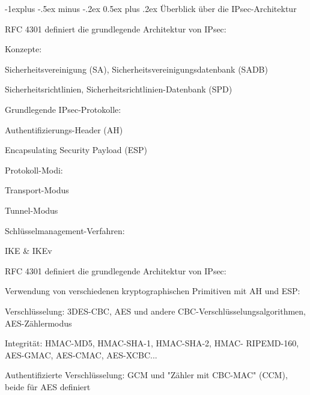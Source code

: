 \documentclass[a4paper]{article}
\makeatletter
\renewcommand{\subsection}{\@startsection{subsection}{2}{0mm}%
 {-1explus -.5ex minus -.2ex}%
 {0.5ex plus .2ex}%
 {\normalfont\normalsize\bfseries}}
\makeatother
\begin{document}
\begin{multicols}{3}


      \subsection{Überblick über die
            IPsec-Architektur}

      \begin{itemize*}
            \item RFC 4301 definiert die grundlegende Architektur von IPsec:
            \begin{itemize*}
                  \item Konzepte:
                  \begin{itemize*} \item Sicherheitsvereinigung (SA), Sicherheitsvereinigungsdatenbank (SADB) \item Sicherheitsrichtlinien, Sicherheitsrichtlinien-Datenbank (SPD) \end{itemize*}
                  \item Grundlegende IPsec-Protokolle:
                  \begin{itemize*} \item Authentifizierungs-Header (AH) \item Encapsulating Security Payload (ESP) \end{itemize*}
                  \item Protokoll-Modi:
                  \begin{itemize*} \item Transport-Modus \item Tunnel-Modus \end{itemize*}
                  \item Schlüsselmanagement-Verfahren:
                  \begin{itemize*} \item IKE \& IKEv \end{itemize*}
            \end{itemize*}
            \item RFC 4301 definiert die grundlegende Architektur von IPsec:
            \begin{itemize*}
                  \item Verwendung von verschiedenen kryptographischen Primitiven mit AH und ESP:
                  \begin{itemize*} \item Verschlüsselung: 3DES-CBC, AES und andere CBC-Verschlüsselungsalgorithmen, AES-Zählermodus \item Integrität: HMAC-MD5, HMAC-SHA-1, HMAC-SHA-2, HMAC- RIPEMD-160, AES-GMAC, AES-CMAC, AES-XCBC... \item Authentifizierte Verschlüsselung: GCM und "Zähler mit CBC-MAC" (CCM), beide für AES definiert \end{itemize*}

\end{itemize*}
\end{itemize*}
\end{multicols}
\end{document}
